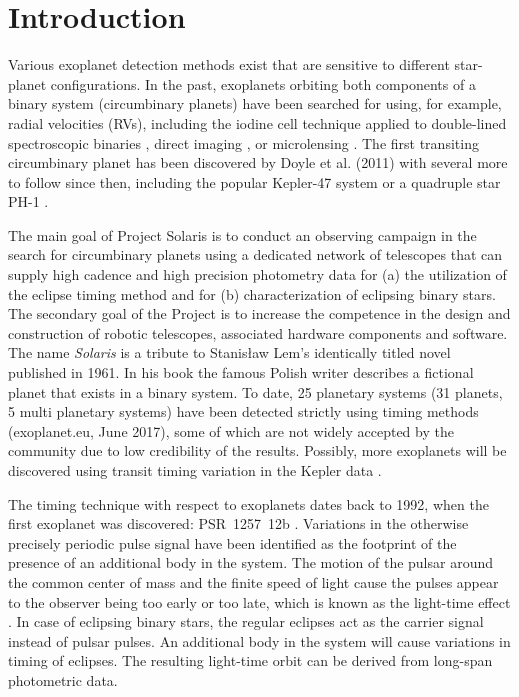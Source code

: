 
\section{Introduction}
\label{sec:Introduction}

Various exoplanet detection methods exist that are sensitive to different star-planet configurations. In the past, exoplanets orbiting both components of a binary system (circumbinary planets) have been searched for using, for example, radial velocities (RVs), including the iodine cell technique applied to double-lined spectroscopic binaries \citep{Konacki2005,Konacki2009}, direct imaging \citep{Currie2014,Kraus2014,Bonavita2016}, or microlensing \citep{Bennett2016}. The first transiting circumbinary planet has been discovered by Doyle et al. (2011) with several more to follow since then, including the popular Kepler-47 system \citep{Orosz2012} or a quadruple star PH-1 \citep{Schwamb2013}.

The main goal of Project Solaris is to conduct an observing campaign in the search for circumbinary planets using a dedicated network of telescopes that can supply high cadence and high precision photometry data for (a) the utilization of the eclipse timing method and for  (b) characterization of eclipsing binary stars. The secondary goal of the Project is to increase the competence in the design and construction of robotic telescopes, associated hardware components and software. The name \textit{Solaris} is a tribute to Stanis\l aw Lem's identically titled novel published in 1961. In his book the famous Polish writer describes a fictional planet that exists in a binary system. To date, 25 planetary systems (31 planets, 5 multi planetary systems) have been detected strictly using timing methods (exoplanet.eu, June 2017), some of which are not widely accepted by the community due to low credibility of the results.  Possibly, more exoplanets will be discovered using transit timing variation in the Kepler data \citep{Borucki2010,Koch2010}.  

The timing technique with respect to exoplanets dates back to 1992, when the first exoplanet was discovered: PSR~1257~12b \citep{Wolszczan1992, Konacki2003}. Variations in the otherwise precisely periodic pulse signal have been identified as the footprint of the presence of an additional body in the system. The motion of the pulsar around the common center of mass and the finite speed of light cause the pulses appear to the observer being too early or too late, which is known as the light-time effect \citep{Sterken2005a,Sterken2005b}. 
In case of eclipsing binary stars, the regular eclipses act as the carrier signal instead of pulsar pulses. An additional body in the system will cause variations in timing of eclipses. The resulting light-time orbit can be derived from long-span photometric data.

